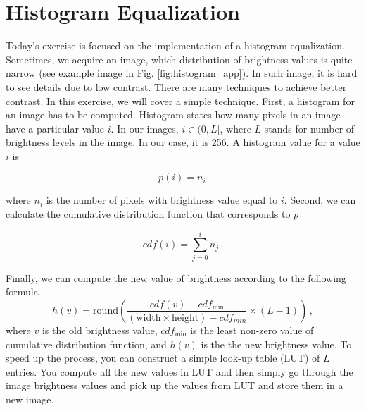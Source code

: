 \documentclass[12pt]{article}
\begin{document}
\section*{Histogram Equalization}

\noindent
Today's exercise is focused on the implementation of a histogram equalization.
\newline
\newline
\noindent
Sometimes, we acquire an image, which distribution of brightness values is quite narrow
(see example image in Fig. \ref{fig:histogram_app}).
In such image, it is hard to see details due to low contrast.
There are many techniques to achieve better contrast. In this exercise, we will cover
a simple technique.
\newline
\newline
\noindent
First, a histogram for an image has to be computed. Histogram states how many pixels in an image
have a particular value $i$. In our images, $i \in ( 0, L ]$, where $L$ stands for number of
brightness levels in the image. In our case, it is 256. A histogram value
for a value $i$ is %

\begin{equation} \label{eq:histogram}
    p(i) = n_i \,
\end{equation}

\noindent
where $n_i$ is the number of pixels with brightness value equal to $i$.
\newline
\newline
\noindent
Second, we can calculate the cumulative distribution function that corresponds to $p$

\begin{equation} \label{eq:cdf}
    cdf(i) = \sum\limits_{j=0}^{i} n_j \, .
\end{equation}

\noindent
Finally, we can compute the new value of brightness according to the following formula
\begin{equation}
    h(v) = \text{round} \left( \frac{cdf(v) - cdf_{\min}}{ \left( \text{width} \times \text{height} \right) - cdf_{min} } \times \left(L - 1\right) \right) \, ,
\end{equation}
where $v$ is the old brightness value, $cdf_{\min}$ is the least non-zero value of cumulative distribution function, and $h(v)$
is the the new brightness value.
\newline
\newline
\noindent
To speed up the process, you can construct a simple look-up table (LUT) of $L$ entries. You compute all the new values
in LUT and then simply go through the image brightness values and pick up the values from LUT and store them in a new image.
\end{document}
